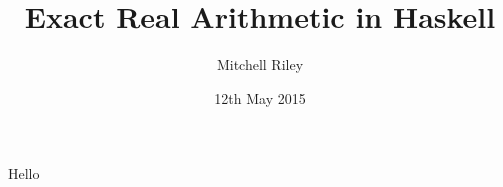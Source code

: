 \documentclass[11pt]{beamer}
\author{Mitchell Riley}
\title{Exact Real Arithmetic in Haskell}
\date{12th May 2015}
\begin{document}
\begin{frame}
\titlepage
\end{frame}

\begin{frame}
Hello
\end{frame}

\begin{frame}
\nocite{*}
\printbibliography
\end{frame}
\end{document}
